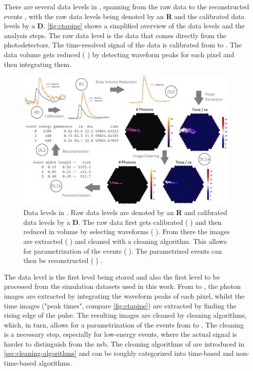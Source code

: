 There are several data levels in \ctapipe{}, spanning from the raw data \rzero{} to the reconstructed events
\dlt{}, with the raw data levels being denoted by an \textbf{R} and the calibrated data levels by a \textbf{D}.
\autoref{fig:ctapipe} shows a simplified overview of the data levels and the analysis steps.
The raw data level \rzero{} is the data that comes directly from the photodetectors. The time-resolved
signal of the data is calibrated from \rzero{} to \rone{}. The data volume gets reduced
(\rone{} \rightarrow \dlz{}) by detecting waveform peaks for each pixel and then integrating them.
\begin{figure}
    \centering
    \includegraphics[width=\textwidth]{graphics/ctapipe.png}
    \caption{Data levels in \ctapipe{}. Raw data levels are denoted by an \textbf{R} and calibrated
    data levels by a \textbf{D}. The raw data first gets calibrated (\rzero{} \rightarrow \rone{})
    and then reduced in volume by selecting waveforms (\rone{} \rightarrow \dlz{}). From there the
    images are extracted (\dlz{} \rightarrow \dloa{}) and cleaned with a cleaning algorithm. This
    allows for parametrization of the events (\dloa{} \rightarrow \dlob{}). The parametrized events
    can then be reconstructed (\dlob{} \rightarrow \dlt{}) \cite{noethe_thesis, hackfeld}.}
    \label{fig:ctapipe}
\end{figure}

The \dlz{} data level is the first level being stored and also the first level to be processed from
the simulation datasets used in this work. From \dlz{} to \dloa{}, the photon images are extracted
by integrating the waveform peaks of each pixel, whilst the time images ("peak times", compare \autoref{fig:ctapipe})
are extracted by finding the rising edge of the pulse. The resulting images are cleaned by cleaning algorithms,
which, in turn, allows for a parametrization of the events from \dloa{} to \dlob{}.
The cleaning is a necessary step, especially for
low-energy events, where the actual signal is harder to distinguish from the \gls{nsb}. The cleaning algorithms
of \ctapipe{} are introduced in \autoref{sec:cleaning-algorithms} and can be roughly categorized into
time-based and non-time-based algorithms.

